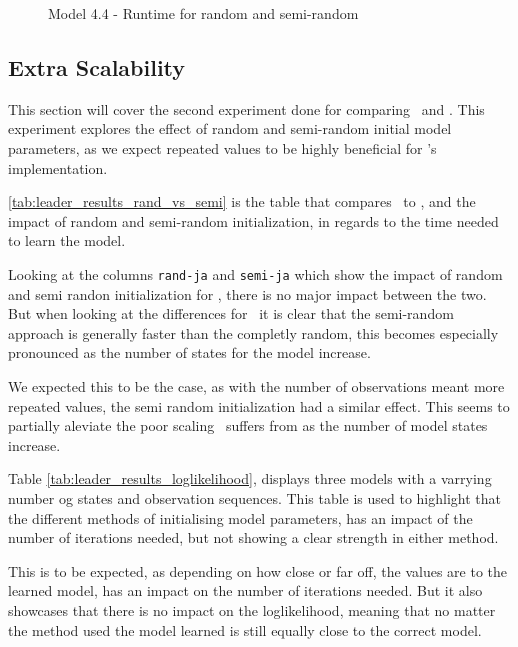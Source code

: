 \begin{figure}
    
    \caption{Model 4.4 - Runtime for random and semi-random}
    \label{fig:semirandom-cupaal-jajapy-4-4}
\end{figure}



\subsection{Extra Scalability}\label{subsec:extra_scalability}
This section will cover the second experiment done for comparing \Cupaal\ and \Jajapy.
This experiment explores the effect of random and semi-random initial model parameters, as we expect repeated values to be highly beneficial for \Cupaal's implementation.

\autoref{tab:leader_results_rand_vs_semi} is the table that compares \Cupaal\ to \Jajapy, and the impact of random and semi-random initialization, in regards to the time needed to learn the model.

Looking at the columns \texttt{rand-ja} and \texttt{semi-ja} which show the impact of random and semi randon initialization for \Jajapy, there is no major impact between the two.
But when looking at the differences for \Cupaal\ it is clear that the semi-random approach is generally faster than the completly random, this becomes especially pronounced as the number of states for the model increase.

We expected this to be the case, as with the number of observations meant more repeated values, the semi random initialization had a similar effect.
This seems to partially aleviate the poor scaling \Cupaal\ suffers from as the number of model states increase.

Table \autoref{tab:leader_results_loglikelihood}, displays three models with a varrying number og states and observation sequences.
This table is used to highlight that the different methods of initialising model parameters, has an impact of the number of iterations needed, but not showing a clear strength in either method.

This is to be expected, as depending on how close or far off, the values are to the learned model, has an impact on the number of iterations needed.
But it also showcases that there is no impact on the loglikelihood, meaning that no matter the method used the model learned is still equally close to the correct model.

